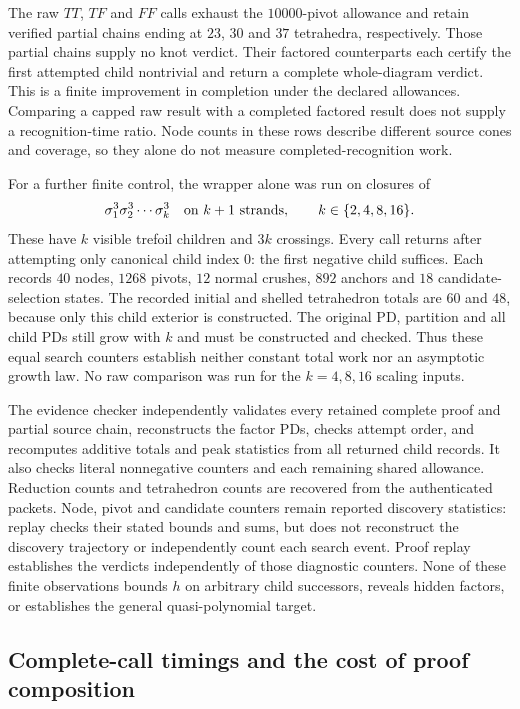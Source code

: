 The raw $TT$, $TF$ and $FF$ calls exhaust the $10000$-pivot allowance and
retain verified partial chains ending at $23$, $30$ and $37$ tetrahedra,
respectively.  Those partial chains supply no knot verdict.  Their
factored counterparts each certify the first attempted child nontrivial
and return a complete whole-diagram verdict.  This is a finite improvement
in completion under the declared allowances.  Comparing a capped raw
result with a completed factored result does not supply a recognition-time
ratio.  Node counts in these rows describe different source cones and
coverage, so they alone do not measure completed-recognition work.

For a further finite control, the wrapper alone was run on closures of
\[
 \sigma_1^3\sigma_2^3\cdots\sigma_k^3
 \quad\hbox{on }k+1\hbox{ strands},\qquad k\in\{2,4,8,16\}.
\]
These have $k$ visible trefoil children and $3k$ crossings.  Every call
returns  after attempting only canonical child index $0$:
the first negative child suffices.  Each records $40$ nodes, $1268$ pivots,
$12$ normal crushes, $892$ anchors and $18$ candidate-selection states.
The recorded initial and shelled tetrahedron totals are $60$ and $48$,
because only this child exterior is constructed.  The original PD,
partition and all child PDs still grow with $k$ and must be constructed
and checked.  Thus these equal search counters establish neither constant
total work nor an asymptotic growth law.  No raw comparison was run for
the $k=4,8,16$ scaling inputs.

The evidence checker independently validates every retained complete proof
and partial source chain, reconstructs the factor PDs, checks attempt order,
and recomputes additive totals and peak statistics from all returned child
records.  It also checks literal nonnegative counters and each remaining
shared allowance.  Reduction counts and tetrahedron counts are recovered
from the authenticated packets.  Node, pivot and candidate counters remain
reported discovery statistics: replay checks their stated bounds and sums,
but does not reconstruct the discovery trajectory or independently count
each search event.  Proof replay establishes the verdicts independently of
those diagnostic counters.  None of these finite observations bounds $h$
on arbitrary child successors, reveals hidden factors, or establishes the
general quasi-polynomial target.

\subsection{Complete-call timings and the cost of proof composition}

